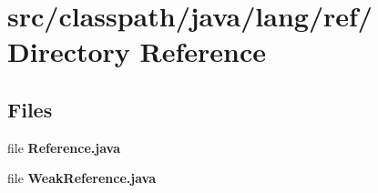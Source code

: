 \section{src/classpath/java/lang/ref/ Directory Reference}
\label{dir_42b2cdaebea7da9fb02e7a8e4c160db1}
\subsection*{Files}
\begin{DoxyCompactItemize}
\item 
file {\bfseries Reference.java}
\item 
file {\bfseries WeakReference.java}
\end{DoxyCompactItemize}
